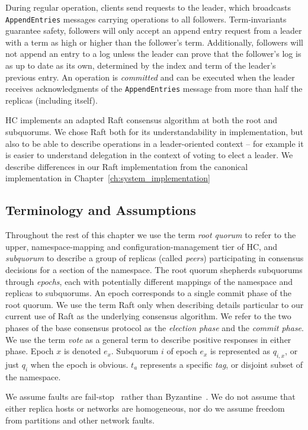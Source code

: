 During regular operation, clients send requests to the leader, which broadcasts \texttt{AppendEntries} messages carrying operations to all followers.
Term-invariants guarantee safety, followers will only accept an append entry request from a leader with a term as high or higher than the follower's term.
Additionally, followers will not append an entry to a log unless the leader can prove that the follower's log is as up to date as its own, determined by the index and term of the leader's previous entry.
An operation is \emph{committed} and can be executed when the leader receives acknowledgments of the \texttt{AppendEntries} message from more than half the replicas (including itself).

HC implements an adapted Raft consensus algorithm at both the root and subquorums.
We chose Raft both for its understandability in implementation, but also to be able to describe operations in a leader-oriented context -- for example it is easier to understand delegation in the context of voting to elect a leader.
We describe differences in our Raft implementation from the canonical implementation in Chapter~\ref{ch:system_implementation}

\subsection{Terminology and Assumptions}
\label{ch03_terminology}

Throughout the rest of this chapter we use the term \emph{root quorum} to refer to the upper, namespace-mapping and configuration-management tier of HC, and \emph{subquorum} to describe a group of replicas (called \emph{peers}) participating in consensus decisions for a section of the namespace.
The root quorum shepherds subquorums through \emph{epochs}, each with potentially different mappings of the namespace and replicas to subquorums.
An epoch corresponds to a single commit phase of the root quorum.
We use the term Raft only when describing details particular to our current use of Raft as the underlying consensus algorithm.
We refer to the two phases of the base consensus protocol as the \emph{election phase} and the \emph{commit phase}.
We use the term \emph{vote} as a general term to describe positive responses in either phase.
Epoch $x$ is denoted $e_x$.
Subquorum $i$ of epoch $e_x$ is represented as $q_{i,x}$, or just $q_i$ when the epoch is obvious.
$t_a$ represents a specific \emph{tag}, or disjoint subset of the namespace.

We assume faults are fail-stop~\cite{fail-stop} rather than Byzantine~\cite{byzantine-generals}.
We do not assume that either replica hosts or networks are homogeneous, nor do we assume freedom from partitions and other network faults.


